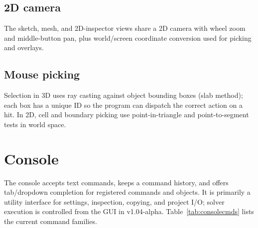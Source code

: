 \documentclass[11pt]{article}
\begin{document}
\subsection{2D camera}
The sketch, mesh, and 2D-inspector views share a 2D camera with wheel zoom and
middle-button pan, plus world/screen coordinate conversion used for picking and
overlays.

\subsection{Mouse picking}
Selection in 3D uses ray casting against object bounding boxes (slab method); each box
has a unique ID so the program can dispatch the correct action on a hit. In 2D, cell and
boundary picking use point-in-triangle and point-to-segment tests in world space.

\section{Console}\label{sec:console}
The console accepts text commands, keeps a command history, and offers tab/dropdown
completion for registered commands and objects. It is primarily a utility interface for
settings, inspection, copying, and project I/O; solver execution is controlled from the
GUI in v1.04-alpha. Table~\ref{tab:consolecmds} lists the current command families.
\end{document}
